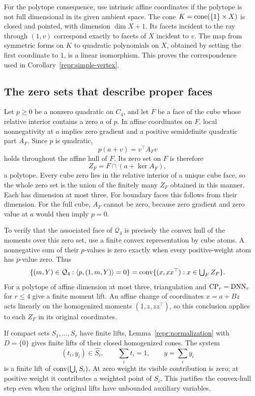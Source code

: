 For the polytope consequence, use intrinsic affine coordinates if the
polytope is not full dimensional in its given ambient space. The cone
$K=\operatorname{cone}(\{1\}\times X)$ is closed and pointed, with dimension
$\dim X+1$. Its facets incident to the ray through $(1,v)$ correspond
exactly to facets of $X$ incident to $v$. The map from symmetric forms on
$K$ to quadratic polynomials on $X$, obtained by setting the first
coordinate to $1$, is a linear isomorphism. This proves the correspondence
used in Corollary~\ref{repr:simple-vertex}.

\subsection{The zero sets that describe proper faces}
\label{repr:face-proof}

Let $p\geq0$ be a nonzero quadratic on $C_4$, and let $F$ be a face of the
cube whose relative interior contains a zero $a$ of $p$. In affine
coordinates on $F$, local nonnegativity at $a$ implies zero gradient and a
positive semidefinite quadratic part $A_F$. Since $p$ is quadratic,
\[
 p(a+v)=v^\top A_Fv
\]
holds throughout the affine hull of $F$. Its zero set on $F$ is therefore
\[
 Z_F=F\cap(a+\ker A_F),
\]
a polytope. Every cube zero lies in the relative interior of a unique cube
face, so the whole zero set is the union of the finitely many $Z_F$ obtained
in this manner. Each has dimension at most three. For boundary faces this
follows from their dimension. For the full cube, $A_F$ cannot be zero,
because zero gradient and zero value at $a$ would then imply $p=0$.

To verify that the associated face of $\mathcal Q_4$ is precisely the
convex hull of the moments over this zero set, use a finite convex
representation by cube atoms. A nonnegative sum of their $p$-values is
zero exactly when every positive-weight atom has $p$-value zero. Thus
\[
 \{(m,Y)\in\mathcal Q_4:\left\langle p,(1,m,Y)\right\rangle=0\}
 =\operatorname{conv}\{(x,xx^\top):x\in\textstyle\bigcup_F Z_F\}.
\]
For a polytope of affine dimension at most three, triangulation and
$\operatorname{CP}_r=\operatorname{DNN}_r$ for $r\leq4$ give a finite moment lift. An affine change of
coordinates $x=a+Bz$ acts linearly on the homogenized moments
$(1,z,zz^\top)$, so this conclusion applies to each $Z_F$ in its original
coordinates.

If compact sets $S_1,\ldots,S_r$ have finite lifts, Lemma~\ref{repr:normalization}
with $D=\{0\}$ gives finite lifts of their closed homogenized cones. The
system
\[
 (t_i,y_i)\in\widehat{S_i},\qquad
 \sum_i t_i=1,\qquad y=\sum_i y_i
\]
is a finite lift of $\operatorname{conv}(\bigcup_i S_i)$. At zero weight its visible
contribution is zero; at positive weight it contributes a weighted point
of $S_i$. This justifies the convex-hull step even when the original lifts
have unbounded auxiliary variables.


